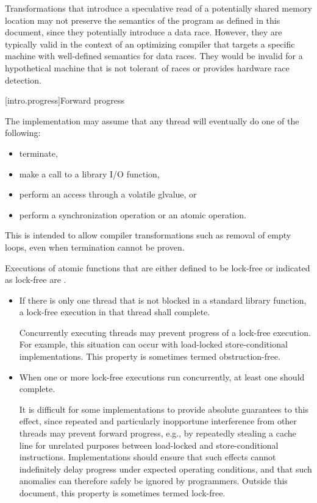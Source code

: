 \pnum
\begin{note}
Transformations that introduce a speculative read of a potentially
shared memory location may not preserve the semantics of the \Cpp{} program as
defined in this document, since they potentially introduce a data race. However,
they are typically valid in the context of an optimizing compiler that targets a
specific machine with well-defined semantics for data races. They would be
invalid for a hypothetical machine that is not tolerant of races or provides
hardware race detection.
\end{note}

[intro.progress]{Forward progress}

\pnum
The implementation may assume that any thread will eventually do one of the
following:
\begin{itemize}
\item terminate,
\item make a call to a library I/O function,
\item perform an access through a volatile glvalue, or
\item perform a synchronization operation or an atomic operation.
\end{itemize}
\begin{note}
This is intended to allow compiler transformations such as removal of
empty loops, even when termination cannot be proven.
\end{note}

\pnum
Executions of atomic functions
that are either defined to be lock-free
or indicated as lock-free
are .
\begin{itemize}
\item
  If there is only one thread that is not blocked
  in a standard library function,
  a lock-free execution in that thread shall complete.
  \begin{note}
    Concurrently executing threads
    may prevent progress of a lock-free execution.
    For example,
    this situation can occur
    with load-locked store-conditional implementations.
    This property is sometimes termed obstruction-free.
  \end{note}
\item
  When one or more lock-free executions run concurrently,
  at least one should complete.
  \begin{note}
    It is difficult for some implementations
    to provide absolute guarantees to this effect,
    since repeated and particularly inopportune interference
    from other threads
    may prevent forward progress,
    e.g.,
    by repeatedly stealing a cache line
    for unrelated purposes
    between load-locked and store-conditional instructions.
    Implementations should ensure
    that such effects cannot indefinitely delay progress
    under expected operating conditions,
    and that such anomalies
    can therefore safely be ignored by programmers.
    Outside this document,
    this property is sometimes termed lock-free.
  \end{note}
\end{itemize}

